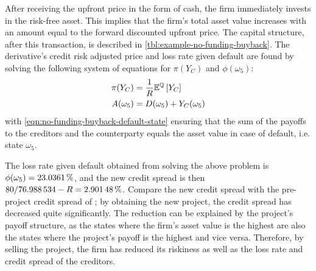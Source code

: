 \documentclass[../main.tex]{subfiles}
\begin{document}
            After receiving the upfront price in the form of cash, the firm immediately invests in the risk-free asset. 
            This implies that the firm's total asset value increases 
            with an amount equal to the forward discounted upfront price. 
            The capital structure, after this transaction, is described in \cref{tbl:example-no-funding-buyback}.
            The derivative's credit risk adjusted price and loss rate given default are found
            by solving the following system of equations for $\pi(Y_C)$ and $\phi(\omega_{5})$:
            \begin{align}
                \pi(Y_C) &= \frac{1}{R}\mathbb{E}^{\mathbb{Q}}\left[Y_{C}\right]
                \label{eqn:no-funding-buyback-derivative-fair-value}
                \\
                A(\omega_5) &= D(\omega_5) + Y_C(\omega_5)
                \label{eqn:no-funding-buyback-default-state}
            \end{align}
            with \cref{eqn:no-funding-buyback-default-state} ensuring that the 
            sum of the payoffs to the creditors and the counterparty
            equals the asset value in case of default, i.e. state $\omega_5$.

            The loss rate given default obtained from solving the above problem is 
            $\phi(\omega_{5}) = \pct{0.230361}$, 
            and the new credit spread is then 
            $\num{80}/\num{76.988534} - \grossrfrate = \pct{0.0290148}$.
            Compare the new credit spread with the pre-project credit spread of ;
            by obtaining the new project, the credit spread has decreased quite significantly.
            The reduction can be explained by the project's payoff structure,
            as the states where the firm's asset value is the highest are
            also the states where the project's payoff is the highest and vice versa. 
            Therefore, by selling the project, the firm has reduced its riskiness
            as well as the loss rate and credit spread of the creditors.
\end{document}
